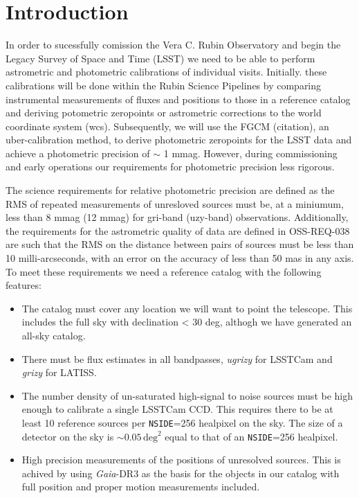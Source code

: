 \section{Introduction}
In order to sucessfully comission the Vera C. Rubin Observatory and begin the Legacy Survey of Space and Time (LSST) we need to be able to perform astrometric and photometric calibrations of individual visits. 
Initially. these calibrations will be done within the Rubin Science Pipelines by comparing instrumental measurements of fluxes and positions to those in a reference catalog and deriving potometric zeropoints or astrometric corrections to the world coordinate system (wcs). 
Subsequently, we will use the FGCM (citation), an uber-calibration method, to derive photometric zeropoints for the LSST data and achieve a photometric precision of $\sim$ 1 mmag. %
However, during commissioning and early operations our requirements for photometric precision less rigorous. 

The science requirements for relative photometric precision \citep[OSS-REQ-0387;][]{LSE-30} are defined as the RMS of repeated measurements of unresloved sources must be, at a miniumum, less than 8 mmag (12 mmag) for gri-band (uzy-band) observations. 
Additionally, the requirements for the astrometric quality of data are defined in OSS-REQ-038 are such that the RMS on the distance between pairs of sources must be less than 10 milli-arcseconds, with an error on the accuracy of less than 50 mas in any axis. 
To meet these requirements we need a reference catalog with the following features:

\begin{itemize}
    \item The catalog must cover any location we will want to point the telescope. 
    This includes the full sky with declination < 30 deg, althogh we have generated an all-sky catalog. 
    \item There must be flux estimates in all bandpasses, \textit{ugrizy} for LSSTCam and \textit{grizy} for LATISS. 
    \item The number density of un-saturated high-signal to noise sources must be high enough to calibrate a single LSSTCam CCD. 
    This requires there to be at least 10 reference sources per \texttt{NSIDE}=256 healpixel on the sky.
    The size of a detector on the sky is $\sim 0.05\,\mathrm{deg}^2$  equal to that of an \texttt{NSIDE}=256 healpixel. 
    \item High precision measurements of the positions of unresolved sources. 
    This is achived by using \textit{Gaia}-DR3 as the basis for the objects in our catalog with full position and proper motion measurements included. 
    
\end{itemize} 

